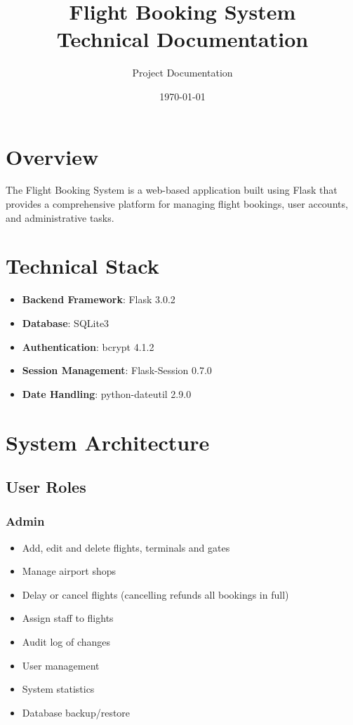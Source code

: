 \documentclass{article}
\title{Flight Booking System\\Technical Documentation}
\author{Project Documentation}
\date{\today}
\begin{document}
\maketitle
\tableofcontents

\section{Overview}
The Flight Booking System is a web-based application built using Flask that provides a comprehensive platform for managing flight bookings, user accounts, and administrative tasks.

\section{Technical Stack}
\begin{itemize}
    \item \textbf{Backend Framework}: Flask 3.0.2
    \item \textbf{Database}: SQLite3
    \item \textbf{Authentication}: bcrypt 4.1.2
    \item \textbf{Session Management}: Flask-Session 0.7.0
    \item \textbf{Date Handling}: python-dateutil 2.9.0
\end{itemize}

\section{System Architecture}

\subsection{User Roles}
\subsubsection{Admin}
\begin{itemize}
    \item Add, edit and delete flights, terminals and gates
    \item Manage airport shops
    \item Delay or cancel flights (cancelling refunds all bookings in full)
    \item Assign staff to flights
    \item Audit log of changes
    \item User management
    \item System statistics
    \item Database backup/restore
\end{itemize}
\end{document}

